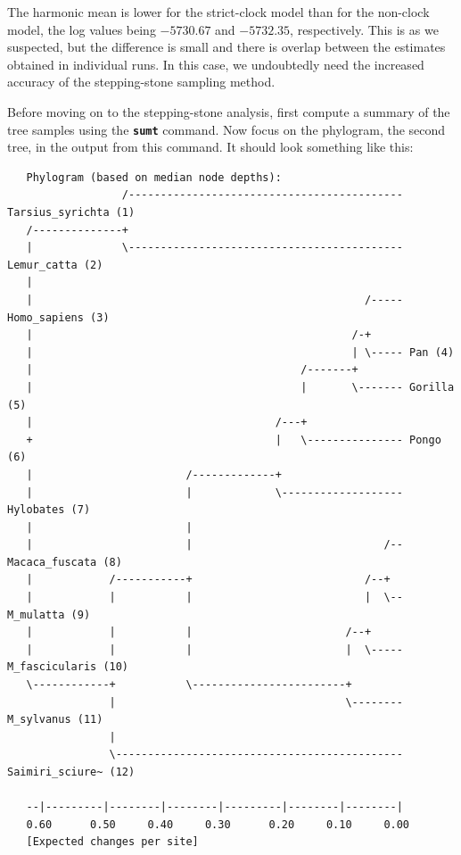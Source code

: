 \documentclass[12pt]{book}
\newcommand{\ttt}[1]{\texttt{#1}}
\newcommand{\tb}[1]{\ttt{\textbf{#1}}}
\begin{document}
The harmonic mean is lower for the strict-clock model than for the non-clock model, the log values
being $-5730.67$ and $-5732.35$, respectively. This is as we suspected, but the difference is small
and there is overlap between the estimates obtained in individual runs. In this case, we
undoubtedly need the increased accuracy of the stepping-stone sampling method.

Before moving on to the stepping-stone analysis, first compute a summary of the tree samples using
the \tb{sumt} command. Now focus on the phylogram, the second tree, in the output from this
command. It should look something like this:

\begin{singlespacing}
\scriptsize
\begin{verbatim}
   Phylogram (based on median node depths):
                  /------------------------------------------- Tarsius_syrichta (1)
   /--------------+                                                                
   |              \------------------------------------------- Lemur_catta (2)
   |                                                                               
   |                                                    /----- Homo_sapiens (3)
   |                                                  /-+                          
   |                                                  | \----- Pan (4)
   |                                          /-------+                            
   |                                          |       \------- Gorilla (5)
   |                                      /---+                                    
   +                                      |   \--------------- Pongo (6)
   |                        /-------------+                                        
   |                        |             \------------------- Hylobates (7)
   |                        |                                                      
   |                        |                              /-- Macaca_fuscata (8)
   |            /-----------+                           /--+                       
   |            |           |                           |  \-- M_mulatta (9)
   |            |           |                        /--+                          
   |            |           |                        |  \----- M_fascicularis (10)
   \------------+           \------------------------+                             
                |                                    \-------- M_sylvanus (11)
                |                                                                  
                \--------------------------------------------- Saimiri_sciure~ (12)
                                                                                   
   --|---------|--------|--------|---------|--------|--------|                     
   0.60      0.50     0.40     0.30      0.20     0.10     0.00                    
   [Expected changes per site]
\end{verbatim}
\normalsize
\end{singlespacing}
\end{document}
